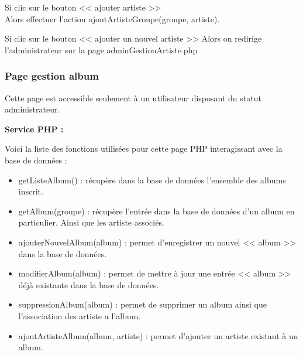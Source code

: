 			\begin{paragraphe}
				Si clic sur le bouton << ajouter artiste >> \\
				Alors effectuer l'action ajoutArtisteGroupe(groupe, artiste).
			\end{paragraphe}

			\begin{paragraphe}
				Si clic sur le bouton << ajouter un nouvel artiste >>
				Alors on redirige l'administrateur sur la page adminGestionArtiste.php
			\end{paragraphe}

		\subsubsection{Page gestion album}

			\begin{paragraphe}
				Cette page est accessible seulement à un utilisateur disposant du statut administrateur.
			\end{paragraphe}

			\begin{paragraphe}
				\textbf{Service PHP :}
			\end{paragraphe}

			\begin{paragraphe}
				Voici la liste des fonctions utilisées pour cette page PHP interagissant avec la base de données :
			\end{paragraphe}

			\begin{paragraphe}
				\begin{itemize}
					\item getListeAlbum() : récupère dans la base de données l'ensemble des albums inscrit.
					\item getAlbum(groupe) : récupère l'entrée dans la base de données d'un album en particulier. Ainsi que les artiste associés.
					\item ajouterNouvelAlbum(album) : permet d'enregistrer un nouvel << album >> dans la base de données.
					\item modifierAlbum(album) : permet de mettre à jour une entrée << album >> déjà existante dans la base de données.
					\item suppressionAlbum(album) : permet de supprimer un album ainsi que l'association des artiste a l'album.
					\item ajoutArtisteAlbum(album, artiste) : permet d'ajouter un artiste existant à un album.
				\end{itemize}
			\end{paragraphe}

